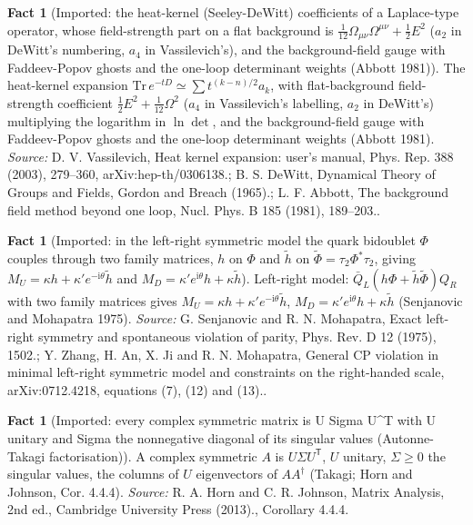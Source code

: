 \documentclass[11pt]{article}
\theoremstyle{definition}
\newtheorem{fact}[theorem]{Fact}
\theoremstyle{plain}
\begin{document}
\begin{fact}[Imported: the heat-kernel (Seeley-DeWitt) coefficients of a Laplace-type operator, whose field-strength part on a flat background is $\tfrac{1}{12}\Omega_{\mu\nu}\Omega^{\mu\nu} + \tfrac12E^{2}$ ($a_{2}$ in DeWitt's numbering, $a_{4}$ in Vassilevich's), and the background-field gauge with Faddeev-Popov ghosts and the one-loop determinant weights (Abbott 1981)]\label{c:synthesis.imported-heat-kernel-coefficients-and-background-field-gauge}
The heat-kernel expansion $\mathrm{Tr}\,e^{-tD} \simeq \sum t^{(k-n)/2}a_{k}$, with flat-background field-strength coefficient $\tfrac12E^{2} + \tfrac1{12}\Omega^{2}$ ($a_{4}$ in Vassilevich's labelling, $a_{2}$ in DeWitt's) multiplying the logarithm in $\ln\det$, and the background-field gauge with Faddeev-Popov ghosts and the one-loop determinant weights (Abbott 1981).
\emph{Source:} D. V. Vassilevich, Heat kernel expansion: user's manual, Phys. Rep. 388 (2003), 279--360, arXiv:hep-th/0306138.; B. S. DeWitt, Dynamical Theory of Groups and Fields, Gordon and Breach (1965).; L. F. Abbott, The background field method beyond one loop, Nucl. Phys. B 185 (1981), 189--203..
\end{fact}

\begin{fact}[Imported: in the left-right symmetric model the quark bidoublet $\Phi$ couples through two family matrices, $h$ on $\Phi$ and $\tilde{h}$ on $\tilde{\Phi} = \tau_{2}\Phi^{*}\tau_{2}$, giving $M_{U} = \kappa h + \kappa'e^{-\mathrm{i}\theta}\tilde{h}$ and $M_{D} = \kappa'e^{\mathrm{i}\theta}h + \kappa\tilde{h}$]\label{c:synthesis.imported-left-right-bidoublet-two-yukawa-couplings}
Left-right model: $\bar{Q}_{L}(h\Phi + \tilde{h}\tilde{\Phi})Q_{R}$ with two family matrices gives $M_{U} = \kappa h + \kappa'e^{-\mathrm{i}\theta}\tilde{h}$, $M_{D} = \kappa'e^{\mathrm{i}\theta}h + \kappa\tilde{h}$ (Senjanovic and Mohapatra 1975).
\emph{Source:} G. Senjanovic and R. N. Mohapatra, Exact left-right symmetry and spontaneous violation of parity, Phys. Rev. D 12 (1975), 1502.; Y. Zhang, H. An, X. Ji and R. N. Mohapatra, General CP violation in minimal left-right symmetric model and constraints on the right-handed scale, arXiv:0712.4218, equations (7), (12) and (13)..
\end{fact}

\begin{fact}[Imported: every complex symmetric matrix is U Sigma U\^{}T with U unitary and Sigma the nonnegative diagonal of its singular values (Autonne-Takagi factorisation)]\label{c:synthesis.imported-takagi-factorisation}
A complex symmetric $A$ is $U\Sigma U^{\mathsf T}$, $U$ unitary, $\Sigma \ge 0$ the singular values, the columns of $U$ eigenvectors of $AA^{\dagger}$ (Takagi; Horn and Johnson, Cor. 4.4.4).
\emph{Source:} R. A. Horn and C. R. Johnson, Matrix Analysis, 2nd ed., Cambridge University Press (2013)., Corollary 4.4.4.
\end{fact}
\end{document}
